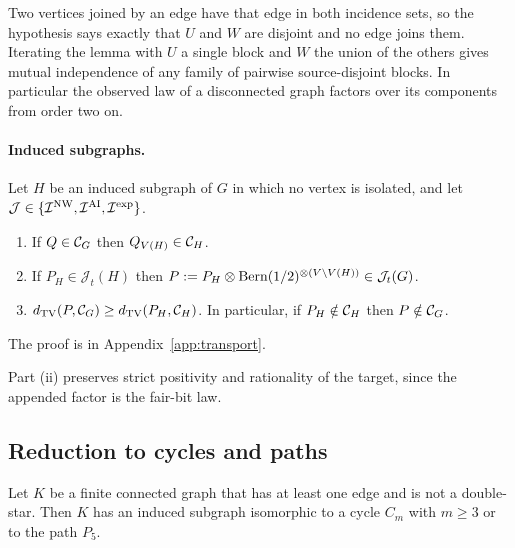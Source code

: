 Two vertices joined by an edge have that edge in both incidence sets, so the hypothesis says exactly that $U$ and $W$ are disjoint and no edge joins them. Iterating the lemma with $U$ a single block and $W$ the union of the others gives mutual independence of any family of pairwise source-disjoint blocks. In particular the observed law of a disconnected graph factors over its components from order two on.

\paragraph{Induced subgraphs.}

\begin{lemma}\label{lem:transport}
Let $H$ be an induced subgraph of $G$ in which no vertex is isolated, and let $\mathcal J\in\{\mathcal I^{\mathrm{NW}},\mathcal I^{\mathrm{AI}},\mathcal I^{\mathrm{exp}}\}$.
\begin{enumerate}[label=(\roman*),nosep]
\item If $Q\in\mathcal C_{G}$ then $Q_{V(H)}\in\mathcal C_{H}$.
\item If $P_H\in\mathcal J_t(H)$ then $P:=P_H\otimes\operatorname{Bern}(1/2)^{\otimes(V\setminus V(H))}\in\mathcal J_t(G)$.
\item $d_{\operatorname{TV}}(P,\mathcal C_{G})\ge d_{\operatorname{TV}}(P_H,\mathcal C_{H})$. In particular, if $P_H\notin\mathcal C_{H}$ then $P\notin\mathcal C_{G}$.
\end{enumerate}
\end{lemma}

The proof is in Appendix~\ref{app:transport}.

Part (ii) preserves strict positivity and rationality of the target, since the appended factor is the fair-bit law.

\subsection{Reduction to cycles and paths}

\begin{lemma}[Exhaustion]\label{lem:exhaustion}
Let $K$ be a finite connected graph that has at least one edge and is not a double-star. Then $K$ has an induced subgraph isomorphic to a cycle $C_m$ with $m\ge3$ or to the path $P_5$.
\end{lemma}

